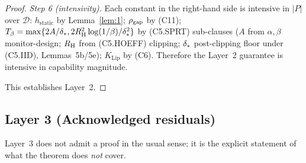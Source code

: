 \begin{proof}
\emph{Step 6 (intensivity).} Each constant in the right-hand side is
intensive in $|P|$ over $\mathcal{D}$:
$h_{\mathrm{static}}$ by Lemma~\ref{lem:1};
$\rho_{\mathrm{gap}}$ by (C11);
$T_{\beta} = \max\{2A/\delta_{*}, 2R_{\mathrm{H}}^2\log(1/\beta)/\delta_{*}^2\}$
by (C5.SPRT) sub-clauses ($A$ from $\alpha, \beta$ monitor-design;
$R_{\mathrm{H}}$ from (C5.HOEFF) clipping; $\delta_{*}$ post-clipping floor
under (C5.IID), Lemmas~5b/5e);
$K_{\mathrm{Lip}}$ by (C6).  Therefore the Layer~2 guarantee is
intensive in capability magnitude.

This establishes Layer~2.
\end{proof}

\subsection{Layer 3 (Acknowledged residuals)}
\label{sec:proof_layer3}

Layer~3 does not admit a proof in the usual sense; it is the
explicit statement of what the theorem does \emph{not} cover.

